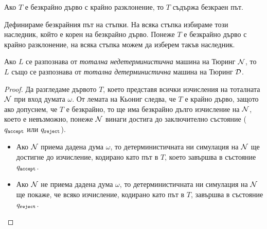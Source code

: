 \begin{prop}
  Ако $T$ е безкрайно дърво с крайно разклонение, то $T$ съдържа безкраен път.
\end{prop}
\begin{hint}
  Дефинираме безкрайния път на стъпки.
  На всяка стъпка избираме този наследник, който е корен на безкрайно дърво.
  Понеже $T$ е безкрайно дърво с крайно разклонение, на всяка стъпка можем да изберем такъв наследник.
\end{hint}

\begin{cor}
  Ако $L$ се разпознава от {\em тотална недетерминистична} машина на Тюринг $\mathcal{N}$, то $L$
  също се разпознава от {\em тотална детерминистична} машина на Тюринг $\mathcal{D}$.
\end{cor}
\begin{proof}
  Да разгледаме дървото $T$, което представя всички изчисления на тоталната $\mathcal{N}$ при вход думата $\omega$.
  От лемата на Кьониг следва, че $T$ е крайно дърво, защото ако допуснем, че $T$ е безкрайно, то ще има безкрайно дълго изчисление на $\mathcal{N}$,
  което е невъзможно, понеже $\mathcal{N}$ винаги достига до заключително състояние ($q_{\texttt{accept}}$ или $q_{\texttt{reject}}$).
  \begin{itemize}
  \item 
    Ако $\mathcal{N}$ приема дадена дума $\omega$, то детерминистичната ни симулация на $\mathcal{N}$ ще достигне до изчисление, кодирано като път в $T$, 
    което завършва в състояние $q_{\texttt{accept}}$.
  \item
    Ако $\mathcal{N}$ не приема дадена дума $\omega$, то детерминистичната ни симулация на $\mathcal{N}$ ще покаже, че всяко изчисление, кодирано като път в $T$, завършва в състояние $q_{\texttt{reject}}$.
  \end{itemize}
\end{proof}



